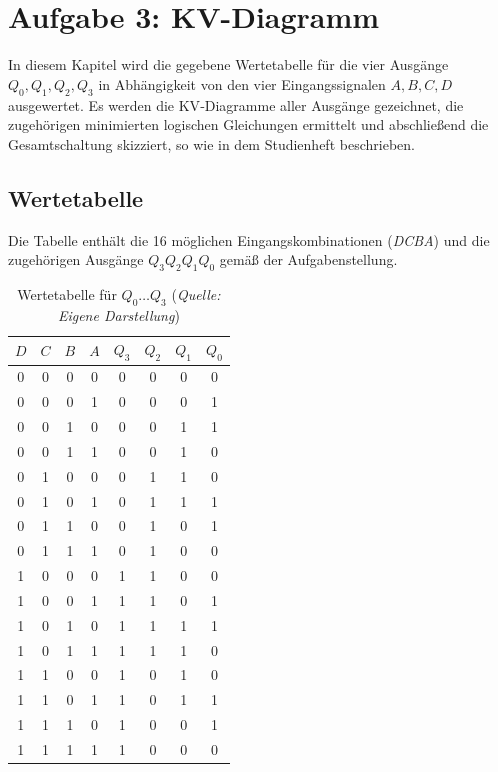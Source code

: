 

\section{Aufgabe 3: KV-Diagramm}
In diesem Kapitel wird die gegebene Wertetabelle für die vier Ausgänge \(Q_0, Q_1, Q_2, Q_3\) in Abhängigkeit von den vier Eingangssignalen \(A, B, C, D\) ausgewertet. 
Es werden die KV‑Diagramme aller Ausgänge gezeichnet, die zugehörigen minimierten logischen Gleichungen ermittelt und abschließend die Gesamtschaltung skizziert, so wie in dem Studienheft \cite{2} beschrieben.
\subsection{Wertetabelle}
Die Tabelle enthält die 16 möglichen Eingangskombinationen (\textit{DCBA}) und die zugehörigen Ausgänge \(Q_3 Q_2 Q_1 Q_0\) gemäß der Aufgabenstellung.
\begin{table}[h]
\centering
\begin{tabular}{c|c|c|c|c|c|c|c}
\toprule
\(D\) & \(C\) & \(B\) & \(A\) & \(Q_3\) & \(Q_2\) & \(Q_1\) & \(Q_0\) \\
\midrule
0 & 0 & 0 & 0 & 0 & 0 & 0 & 0 \\
0 & 0 & 0 & 1 & 0 & 0 & 0 & 1 \\
0 & 0 & 1 & 0 & 0 & 0 & 1 & 1 \\
0 & 0 & 1 & 1 & 0 & 0 & 1 & 0 \\
0 & 1 & 0 & 0 & 0 & 1 & 1 & 0 \\
0 & 1 & 0 & 1 & 0 & 1 & 1 & 1 \\
0 & 1 & 1 & 0 & 0 & 1 & 0 & 1 \\
0 & 1 & 1 & 1 & 0 & 1 & 0 & 0 \\
1 & 0 & 0 & 0 & 1 & 1 & 0 & 0 \\
1 & 0 & 0 & 1 & 1 & 1 & 0 & 1 \\
1 & 0 & 1 & 0 & 1 & 1 & 1 & 1 \\
1 & 0 & 1 & 1 & 1 & 1 & 1 & 0 \\
1 & 1 & 0 & 0 & 1 & 0 & 1 & 0 \\
1 & 1 & 0 & 1 & 1 & 0 & 1 & 1 \\
1 & 1 & 1 & 0 & 1 & 0 & 0 & 1 \\
1 & 1 & 1 & 1 & 1 & 0 & 0 & 0 \\
\bottomrule
\end{tabular}
\caption{Wertetabelle für \(Q_0 \dots Q_3\) (\textit{Quelle: Eigene Darstellung})}
\label{tab:wahrheit}
\end{table}
